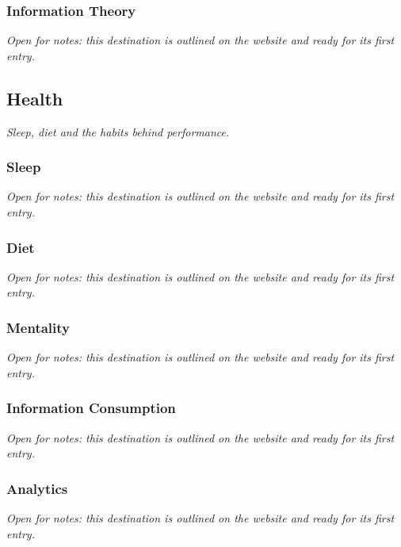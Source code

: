 \documentclass{article}
\begin{document}
\subsubsection{Information Theory}\label{sec:information-theory}
\textit{Open for notes: this destination is outlined on the website and ready for its first entry.}

\subsection{Health}\label{sec:health}
\textit{Sleep, diet and the habits behind performance.}

\subsubsection{Sleep}\label{sec:sleep}
\textit{Open for notes: this destination is outlined on the website and ready for its first entry.}

\subsubsection{Diet}\label{sec:diet}
\textit{Open for notes: this destination is outlined on the website and ready for its first entry.}

\subsubsection{Mentality}\label{sec:mentality}
\textit{Open for notes: this destination is outlined on the website and ready for its first entry.}

\subsubsection{Information Consumption}\label{sec:information-consumption}
\textit{Open for notes: this destination is outlined on the website and ready for its first entry.}

\subsubsection{Analytics}\label{sec:health-analytics}
\textit{Open for notes: this destination is outlined on the website and ready for its first entry.}
\end{document}
